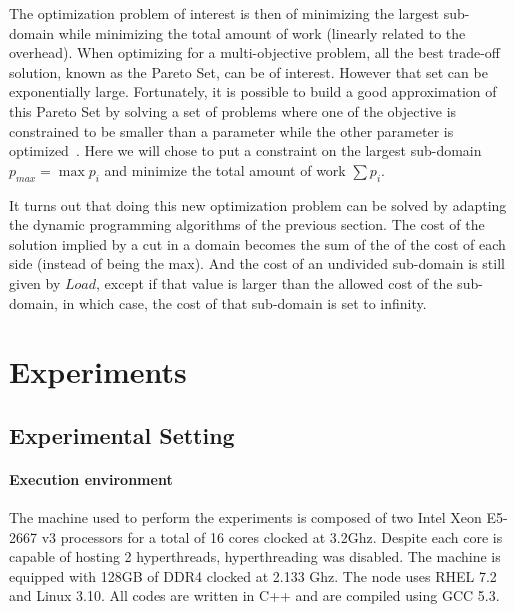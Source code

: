 \documentclass[10pt, conference, compsocconf]{IEEEtran}
\begin{document}
The optimization problem of interest is then of minimizing the largest
sub-domain while minimizing the total amount of work (linearly related
to the overhead). When optimizing for a multi-objective problem, all
the best trade-off solution, known as the Pareto Set, can be of
interest. However that set can be exponentially large. Fortunately, it
is possible to build a good approximation of this Pareto Set by
solving a set of problems where one of the objective is constrained to
be smaller than a parameter while the other parameter is
optimized~\cite{papayanna2000:pareto}. Here we will chose to put a
constraint on the largest sub-domain $p_{max} = \max p_i$ and minimize
the total amount of work $\sum p_i$.

It turns out that doing this new optimization problem can be solved by
adapting the dynamic programming algorithms of the previous
section. The cost of the solution implied by a cut in a domain becomes
the sum of the of the cost of each side (instead of being the
max). And the cost of an undivided sub-domain is still given by $Load$,
except if that value is larger than the allowed cost of the sub-domain,
in which case, the cost of that sub-domain is set to infinity.

\section{Experiments}
\label{sec:experiments}

\subsection{Experimental Setting}

\paragraph{Execution environment} The machine used to perform the experiments is
composed of two Intel Xeon E5-2667 v3 processors for a total of
16 cores clocked at 3.2Ghz. Despite each core is capable of hosting 2
hyperthreads, hyperthreading was disabled. The machine is equipped with
128GB of DDR4 clocked at 2.133 Ghz. The node uses RHEL 7.2
and Linux 3.10. All codes are written in C++ and are compiled using GCC 5.3.
\end{document}
